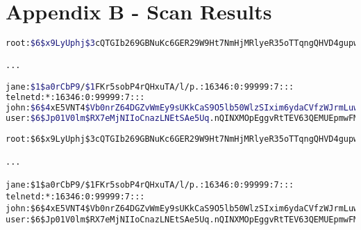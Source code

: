 \section{Appendix B - Scan Results}



\lstset{extendedchars=\true}
\lstset{inputencoding=ansinew}

\begin{lstlisting}[language=bash]
root:$6$x9LyUphj$3cQTGIb269GBNuKc6GER29W9Ht7NmHjMRlyeR35oTTqngQHVD4gupwzSmjhAYOc6KEyfGQ32De27SgOCNzKcE.:16371:0:99999:7:::

...

jane:$1$a0rCbP9/$1FKr5sobP4rQHxuTA/l/p.:16346:0:99999:7:::
telnetd:*:16346:0:99999:7:::
john:$6$4xE5VNT4$Vb0nrZ64DGZvWmEy9sUKkCaS9O5lb50WlzSIxim6ydaCVfzWJrmLuwZIPxjgw1ZDIeQB9C9jX7qb7AtiDibjo0:16346:0:99999:7:::
user:$6$Jp01V0lm$RX7eMjNIIoCnazLNEtSAe5Uq.nQINXMOpEggvRtTEV63QEMUEpmwFMJhYzQtLT/M33Kbl5Mhr59tPJbvN/u4k1:16346:0:99999:7:::
\end{lstlisting}

\begin{lstlisting}
root:$6$x9LyUphj$3cQTGIb269GBNuKc6GER29W9Ht7NmHjMRlyeR35oTTqngQHVD4gupwzSmjhAYOc6KEyfGQ32De27SgOCNzKcE.:16371:0:99999:7:::

...

jane:$1$a0rCbP9/$1FKr5sobP4rQHxuTA/l/p.:16346:0:99999:7:::
telnetd:*:16346:0:99999:7:::
john:$6$4xE5VNT4$Vb0nrZ64DGZvWmEy9sUKkCaS9O5lb50WlzSIxim6ydaCVfzWJrmLuwZIPxjgw1ZDIeQB9C9jX7qb7AtiDibjo0:16346:0:99999:7:::
user:$6$Jp01V0lm$RX7eMjNIIoCnazLNEtSAe5Uq.nQINXMOpEggvRtTEV63QEMUEpmwFMJhYzQtLT/M33Kbl5Mhr59tPJbvN/u4k1:16346:0:99999:7:::
\end{lstlisting}